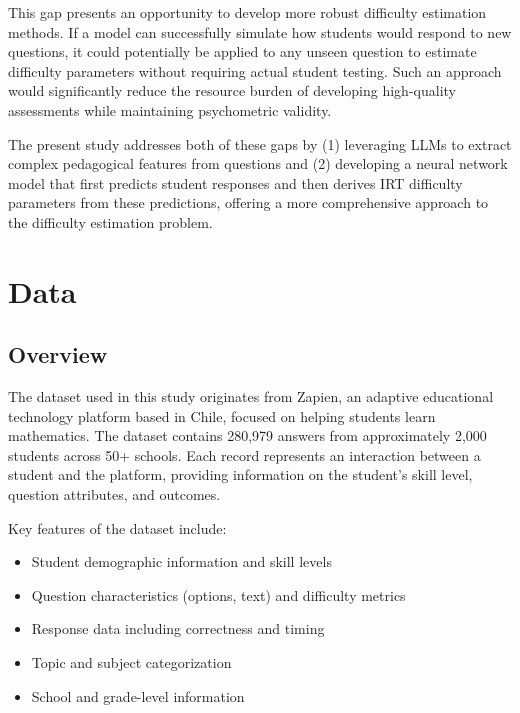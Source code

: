 \documentclass[
    a4paper, %
    10pt, %
    twoside, %
]{LTJournalArticle}
\begin{document}
This gap presents an opportunity to develop more robust difficulty estimation methods. If a model can successfully simulate how students would respond to new questions, it could potentially be applied to any unseen question to estimate difficulty parameters without requiring actual student testing. Such an approach would significantly reduce the resource burden of developing high-quality assessments while maintaining psychometric validity.

The present study addresses both of these gaps by (1) leveraging LLMs to extract complex pedagogical features from questions and (2) developing a neural network model that first predicts student responses and then derives IRT difficulty parameters from these predictions, offering a more comprehensive approach to the difficulty estimation problem.

\section{Data}

\subsection{Overview}
The dataset used in this study originates from Zapien, an adaptive educational technology platform based in Chile, focused on helping students learn mathematics. The dataset contains 280,979 answers from approximately 2,000 students across 50+ schools. Each record represents an interaction between a student and the platform, providing information on the student's skill level, question attributes, and outcomes.

Key features of the dataset include:
\begin{itemize}
    \item Student demographic information and skill levels
    \item Question characteristics (options, text) and difficulty metrics
    \item Response data including correctness and timing
    \item Topic and subject categorization
    \item School and grade-level information
\end{itemize}
\end{document}

